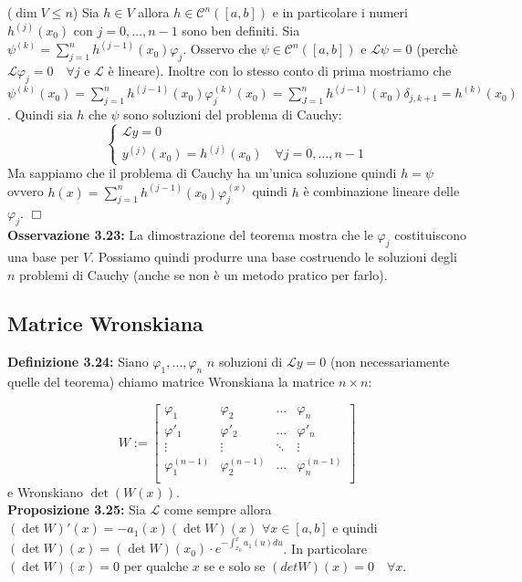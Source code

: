 \documentclass[a4paper,11pt,titlepage]{book}
\begin{document}
($\dim V\leq n$) Sia $h\in V$ allora $h\in\mathcal{C}^n([a,b])$ e in particolare i numeri $h^{(j)}(x_0)$ con $j=0,\ldots,n-1$ sono ben definiti. Sia $\psi^{(k)}=\sum_{j=1}^n h^{(j-1)}(x_0)\varphi_j$. Osservo che $\psi\in\mathcal{C}^n([a,b])$ e $\mathcal{L}\psi=0$ (perchè $\mathcal{L}\varphi_j=0\quad\forall j$ e $\mathcal{L}$ è lineare). Inoltre con lo stesso conto di prima mostriamo che $\psi^{(k)}(x_0)=\sum_{j=1}^n h^{(j-1)}(x_0)\varphi_j^{(k)}(x_0)=\sum_{J=1}^n h^{(j-1)}(x_0)\delta_{j,k+1}=h^{(k)}(x_0)$. Quindi sia $h$ che $\psi$ sono soluzioni del problema di Cauchy:
$$\begin{cases}
\mathcal{L}y=0\\
y^{(j)}(x_0)=h^{(j)}(x_0)\quad\forall j=0,\ldots,n-1
\end{cases}$$
Ma sappiamo che il problema di Cauchy ha un'unica soluzione quindi $h=\psi$ ovvero $h(x)=\sum_{j=1}^n h^{(j-1)}(x_0)\varphi_j^(x)$ quindi $h$ è combinazione lineare delle $\varphi_j$. $\Box$\\

\textbf{Osservazione 3.23:} La dimostrazione del teorema mostra che le $\varphi_j$ costituiscono una base per $V$. Possiamo quindi produrre una base costruendo le soluzioni degli $n$ problemi di Cauchy (anche se non è un metodo pratico per farlo).\\

\subsection{Matrice Wronskiana}

\textbf{Definizione 3.24: }Siano $\varphi_1,\ldots,\varphi_n$ $n$ soluzioni di $\mathcal{L}y=0$ (non necessariamente quelle del teorema) chiamo matrice Wronskiana la matrice $n\times n$:

$$W:=\begin{bmatrix}
\varphi_1 & \varphi_2 & \ldots & \varphi_n \\
\varphi'_1 & \varphi'_2 & \ldots & \varphi'_n \\
\vdots & \vdots & \ddots & \vdots\\
\varphi_1^{(n-1)} & \varphi_2^{(n-1)} & \ldots & \varphi^{(n-1)}_n \\
\end{bmatrix}$$
e Wronskiano $\det(W(x))$.\\

\textbf{Proposizione 3.25: }Sia $\mathcal{L}$ come sempre allora $(\det W)'(x)=-a_1(x)(\det W)(x)$ $\forall x\in [a,b]$ e quindi $(\det W)(x)=(\det W)(x_0)\cdot e^{-\int_{x_0}^x a_1(u)du}$. In particolare $(\det W)(x)=0$ per qualche $x$ se e solo se $(det W)(x)=0\quad\forall x$.\\
\end{document}
